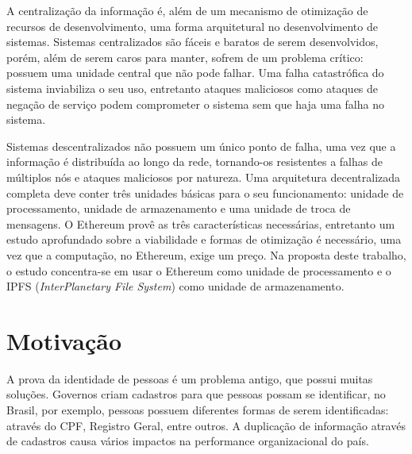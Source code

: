 \documentclass[tcc,capa]{texufpel}
\begin{document}
    
	
	A centralização da informação é, além de um mecanismo de otimização de recursos de desenvolvimento, uma forma arquitetural no desenvolvimento de sistemas. Sistemas centralizados são fáceis e baratos de serem desenvolvidos, porém, além de serem caros para manter, sofrem de um problema crítico: possuem uma unidade central que não pode falhar. Uma falha catastrófica do sistema inviabiliza o seu uso, entretanto ataques maliciosos como ataques de negação de serviço podem comprometer o sistema sem que haja uma falha no sistema.
	
    Sistemas descentralizados não possuem um único ponto de falha, uma vez que a informação é distribuída ao longo da rede, tornando-os resistentes a falhas de múltiplos nós e ataques maliciosos por natureza. Uma arquitetura decentralizada completa deve conter três unidades básicas para o seu funcionamento: unidade de processamento, unidade de armazenamento e uma unidade de troca de mensagens. O Ethereum provê as três características necessárias, entretanto um estudo aprofundado sobre a viabilidade e formas de otimização é necessário, uma vez que a computação, no Ethereum, exige um preço. Na proposta deste trabalho, o estudo concentra-se em usar o Ethereum como unidade de processamento e o IPFS (\emph{InterPlanetary File System}) como unidade de armazenamento.
	
\section{Motivação}\label{sc:motivacao}

    A prova da identidade de pessoas é um problema antigo, que possui muitas soluções. Governos criam cadastros para que pessoas possam se identificar, no Brasil, por exemplo, pessoas possuem diferentes formas de serem identificadas: através do CPF, Registro Geral, entre outros. A duplicação de informação através de cadastros causa vários impactos na performance organizacional do país.
    
\end{document}
